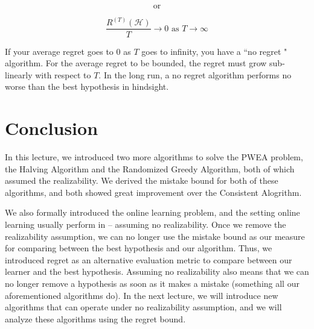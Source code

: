 \documentclass[11pt]{article}
\begin{document}
$$\text{or}$$

$$\frac{R^{(T)}(\mathcal{H})}{T} \rightarrow 0 \text{ as } T \rightarrow \infty$$

If your average regret goes to $0$ as $T$ goes to infinity, you have a ``no regret " algorithm. 
For the average regret to be bounded, the regret must grow sub-linearly with respect to $T$. In the long run, a no regret algorithm performs no worse than the best hypothesis in hindsight.


\section{Conclusion}
In this lecture, we introduced two more algorithms to solve the PWEA problem, the Halving Algorithm and the Randomized Greedy Algorithm, both of which assumed the realizability. We derived the mistake bound for both of these algorithms, and both showed great improvement over the Consistent Alogrithm. 

We also formally introduced the online learning problem, and the setting online learning usually perform in -- assuming no realizability. Once we remove the realizability assumption, we can no longer use the mistake bound as our measure for comparing between the best hypothesis and our algorithm. Thus, we introduced regret as an alternative evaluation metric to compare between our learner and the best hypothesis. Assuming no realizability also means that we can no longer remove a hypothesis as soon as it makes a mistake (something all our aforementioned algorithms do).  In the next lecture, we will introduce new algorithms that can operate under no realizability assumption, and we will analyze these algorithms using the regret bound. 


{


}


\end{document}
